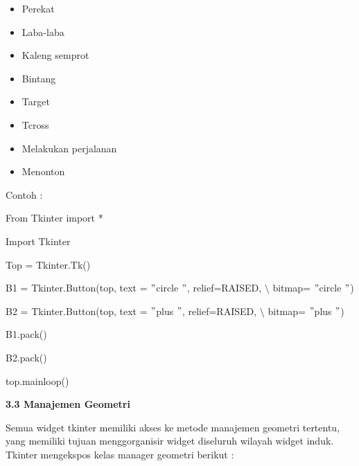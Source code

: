 \begin{itemize}
\begin{itemize}
\noindent 
\item Perekat \par
\noindent 
\item Laba-laba \par
\noindent 
\item Kaleng semprot \par
\noindent 
\item Bintang \par
\noindent 
\item Target \par
\noindent 
\item Tcross \par
\noindent 
\item Melakukan perjalanan \par
\noindent 
\item Menonton\end{itemize}
 \par
\vspace{12pt}
Contoh : \par
{\fontsize{10pt}{10pt}\selectfont From Tkinter import *} \par
{\fontsize{10pt}{10pt}\selectfont Import Tkinter} \par
\vspace{10pt}
{\fontsize{10pt}{10pt}\selectfont Top = Tkinter.Tk()} \par
\vspace{10pt}
{\fontsize{10pt}{10pt}\selectfont B1 = Tkinter.Button(top, text = $ " $circle $ " $, relief=RAISED,  $  \setminus  $ bitmap= $ " $circle $ " $)} \par
{\fontsize{10pt}{10pt}\selectfont B2 = Tkinter.Button(top, text = $ " $plus $ " $, relief=RAISED,  $  \setminus  $ bitmap= $ " $plus $ " $)} \par
\vspace{10pt}
{\fontsize{10pt}{10pt}\selectfont B1.pack()} \par
{\fontsize{10pt}{10pt}\selectfont B2.pack()} \par
{\fontsize{10pt}{10pt}\selectfont top.mainloop()} \par
\vspace{10pt}
\noindent 
\textbf{3.3 Manajemen Geometri} \par
\noindent 
 \hspace*{0.5in} Semua widget tkinter memiliki akses ke metode manajemen geometri tertentu, yang memiliki tujuan menggorganisir widget diseluruh wilayah widget induk. Tkinter mengekspos kelas manager geometri berikut : \par

\end{itemize}
